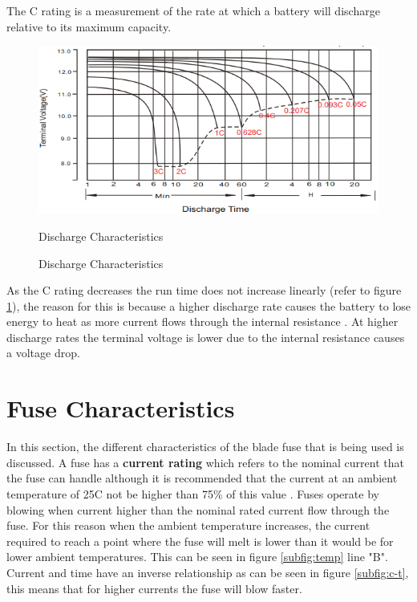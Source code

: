\label{sec:Discharge}
\par The C rating is a measurement of the rate at which a battery will discharge relative to its maximum capacity\cite{MIT}. 
\begin{figure}
\centering
\includegraphics[scale=0.5]{Figures/fig2.png}
\caption[]{Discharge Characteristics}{Discharge Characteristics \cite{Charging-Lead}}
\label{fig:discharge}
\end{figure}
 As the C rating decreases the run time does not increase linearly (refer to figure \ref{fig:discharge}), the reason for this is because a higher discharge rate causes the battery to lose energy to heat as more current flows through the internal resistance \cite{pSonic}. At higher discharge rates the terminal voltage is lower due to the internal resistance causes a voltage drop.



\section{Fuse Characteristics}\label{sec:fuse_lit}
In this section, the different characteristics of the blade fuse that is being used is discussed. A fuse has a \textbf{current rating} which refers to the nominal current that the fuse can handle although it is recommended that the current at an ambient temperature of 25\textdegree C not be higher than 75\% of this value \cite{LF}. Fuses operate by blowing when current higher than the nominal rated current flow through the fuse. For this reason when the ambient temperature increases, the current required to reach a point where the fuse will melt is lower than it would be for lower ambient temperatures. This can be seen in figure \ref{subfig:temp} line "B". Current and time have an inverse relationship as can be seen in figure \ref{subfig:c-t}, this means that for higher currents the fuse will blow faster.


